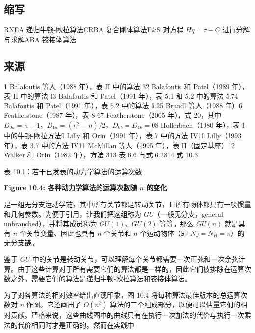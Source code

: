 \documentclass[10pt,a4paper]{book}
\theoremstyle{thmstyle} %
\theoremstyle{defstyle} %
\theoremstyle{prostyle} %
\begin{document}
\subsection{缩写}





RNEA 递归牛顿-欧拉算法CRBA 复合刚体算法F\&S 对方程 $H\ddot{q}=\tau-C$ 进行分解与求解ABA 铰接体算法



\subsection{来源}





1 Balafoutis 等人（1988 年），表 II 中的算法 32 Balafoutis 和 Patel（1989 年），表 II 中的算法 I3 Balafoutis 和 Patel（1991 年），表 5.1 和 5.2 中的算法 5.74 Balafoutis 和 Patel（1991 年），表 6.2 中的算法 6.25 Brandl 等人（1988 年）6 Featherstone（1987 年），表 8-67 Featherstone（2005 年），式 20，其中 $D_{0a} = n - 1$，$D_{1a} = (n^2 - n)/2$，$D_{0b} = D_{1b} = 0$8 Hollerbach（1980 年），表 I 中的牛顿-欧拉方法9 Lilly 和 Orin（1991 年），表 7 中的方法 IV10 Lilly（1993 年），表 3.7 中的方法 IV11 McMillan 等人（1995 年），表 II（固定基座）12 Walker 和 Orin（1982 年），方法 313 表 6.6 与式 6.2814 式 10.3



表 10.1：若干已发表的动力学算法的运算次数



\noindent\textbf{Figure 10.4: 各种动力学算法的运算次数随 $n$ 的变化}





是一组无分支运动学链，其中所有关节都是转动关节，且所有物体都具有一般惯量和几何参数。为便于引用，让我们把这组称为 $GU$（一般无分支，general unbranched），并将其成员称为 $GU(1)$、$GU(2)$ 等等。那么 $GU(n)$ 就是具有 $n$ 个关节变量、因此也具有 $n$ 个关节和 $n$ 个运动物体（即 $N_J = N_B = n$）的无分支链。



鉴于 $GU$ 中的关节是转动关节，可以理解每个关节都需要一次正弦和一次余弦计算。由于这些计算对于所有需要它们的算法都是一样的，因此它们被排除在运算次数之外。需要它们的算法是递归牛顿-欧拉算法和铰接体算法。



为了对各算法的相对效率给出直观印象，图 10.4 将每种算法最佳版本的总运算次数对 $n$ 作图。它还画出了 $O(n^3)$ 算法的三个组成部分，以便可以估量它们的相对贡献。严格来说，这些曲线图中的曲线只有在执行一次加法的代价与执行一次乘法的代价相同时才是正确的。然而在实践中
\end{document}

